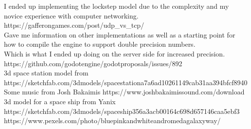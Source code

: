 \documentclass[12pt, DIV=calc]{scrartcl}
\begin{document}
I ended up implementing the lockstep model due to the complexity and my novice experience with computer networking. \\
https://gafferongames.com/post/udp\_vs\_tcp/ \\
Gave me information on other implementations as well as a starting point for how to compile the engine to support double precision numbers.\\
 Which is what I ended up doing on the server side for increased precision. https://github.com/godotengine/godot\-proposals/issues/892 \\
3d space station model from https://sketchfab.com/3d\-models/space\-station\-a7a6ad10261149cab31aa394bfcf8940 \\
Some music from Josh Bakaimis https://www.josh\-bakaimis\-sound.com/download \\
3d model for a space ship from Yanix https://sketchfab.com/3d\-models/space\-ship\-356a3acb00164c698d657146caa5ebf3 \\
https://www.pexels.com/photo/blue\-pink\-and\-white\-andromeda\-galaxy\-way/
\end{document}
